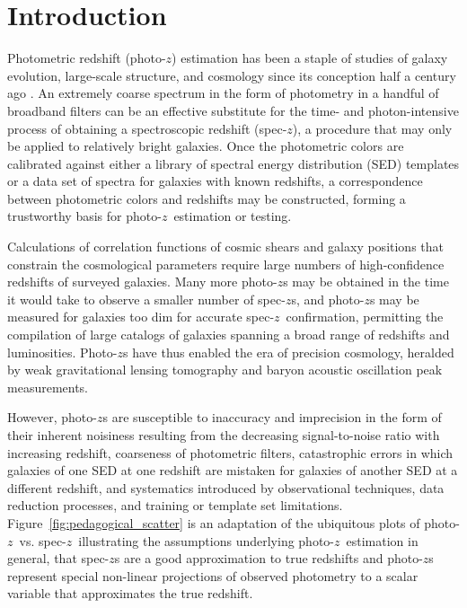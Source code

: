 \documentclass[iop]{emulateapj}
\newcommand{\todo}[3]{{\color{#2}\emph{#1}: #3}}
\newcommand{\aim}[1]{\todo{AIM}{red}{#1}}
\newcommand{\repo}[1]{\texttt{#1}}
\newcommand{\chippr}{\repo{chippr}}
\newcommand{\sz}{spec-$z$}
\newcommand{\pz}{photo-$z$}
\newcommand{\Pz}{Photo-$z$}
\newcommand{\pzpdf}{\pz\ posterior PDF}
\begin{document}

\maketitle


\section{Introduction}
\label{sec:intro}

Photometric redshift (\pz) estimation has been a staple of studies of galaxy evolution, large-scale structure, and cosmology since its conception half a century ago \citep{baum_photoelectric_1962}.  
An extremely coarse spectrum in the form of photometry in a handful of broadband filters can be an effective substitute for the time- and photon-intensive process of obtaining a spectroscopic redshift (\sz), a procedure that may only be applied to relatively bright galaxies.  
Once the photometric colors are calibrated against either a library of spectral energy distribution (SED) templates or a data set of spectra for galaxies with known redshifts, a correspondence between photometric colors and redshifts may be constructed, forming a trustworthy basis for \pz\ estimation or testing.

Calculations of correlation functions of cosmic shears and galaxy positions that constrain the cosmological parameters require large numbers of high-confidence redshifts of surveyed galaxies.  
Many more \pz s may be obtained in the time it would take to observe a smaller number of \sz s, and \pz s may be measured for galaxies too dim for accurate \sz\ confirmation, permitting the compilation of large catalogs of galaxies spanning a broad range of redshifts and luminosities.  
\Pz s have thus enabled the era of precision cosmology, heralded by weak gravitational lensing tomography and baryon acoustic oscillation peak measurements.  

However, \pz s are susceptible to inaccuracy and imprecision in the form of their inherent noisiness resulting from the decreasing signal-to-noise ratio with increasing redshift, coarseness of photometric filters, catastrophic errors in which galaxies of one SED at one redshift are mistaken for galaxies of another SED at a different redshift, and systematics introduced by observational techniques, data reduction processes, and training or template set limitations.  
Figure~\ref{fig:pedagogical_scatter} is an adaptation of the ubiquitous plots of \pz\ vs. \sz\ illustrating the assumptions underlying \pz\ estimation in general, that \sz s are a good approximation to true redshifts and \pz s represent special non-linear projections of observed photometry to a scalar variable that approximates the true redshift.
\end{document}
